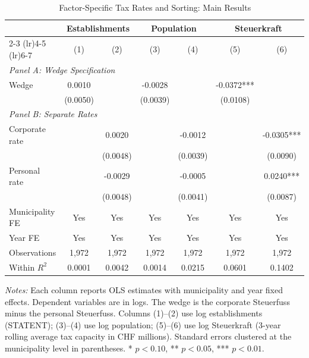 \begin{table}[t]
\centering
\caption{Factor-Specific Tax Rates and Sorting: Main Results}
\label{tab:main}
\begin{tabular}{lcccccc}
\hline\hline
 & \multicolumn{2}{c}{Establishments} & \multicolumn{2}{c}{Population} & \multicolumn{2}{c}{Steuerkraft} \\
\cmidrule(lr){2-3} \cmidrule(lr){4-5} \cmidrule(lr){6-7}
 & (1) & (2) & (3) & (4) & (5) & (6) \\
\hline
\multicolumn{7}{l}{\textit{Panel A: Wedge Specification}} \\[3pt]
Wedge & 0.0010 & & -0.0028 & & -0.0372*** & \\
 & (0.0050) & & (0.0039) & & (0.0108) & \\[6pt]
\multicolumn{7}{l}{\textit{Panel B: Separate Rates}} \\[3pt]
Corporate rate & & 0.0020 & & -0.0012 & & -0.0305*** \\
 & & (0.0048) & & (0.0039) & & (0.0090) \\
Personal rate & & -0.0029 & & -0.0005 & & 0.0240*** \\
 & & (0.0048) & & (0.0041) & & (0.0087) \\
\hline
Municipality FE & Yes & Yes & Yes & Yes & Yes & Yes \\
Year FE & Yes & Yes & Yes & Yes & Yes & Yes \\
Observations & 1,972 & 1,972 & 1,972 & 1,972 & 1,972 & 1,972 \\
Within $R^2$ & 0.0001 & 0.0042 & 0.0014 & 0.0215 & 0.0601 & 0.1402 \\
\hline\hline
\end{tabular}
\begin{tablenotes}
\item \textit{Notes:} Each column reports OLS estimates with municipality and year fixed effects. 
Dependent variables are in logs. The wedge is the corporate Steuerfuss minus the personal Steuerfuss. 
Columns (1)--(2) use log establishments (STATENT); (3)--(4) use log population; (5)--(6) use log Steuerkraft (3-year rolling average tax capacity in CHF millions). 
Standard errors clustered at the municipality level in parentheses. 
* $p<0.10$, ** $p<0.05$, *** $p<0.01$.
\end{tablenotes}
\end{table}
